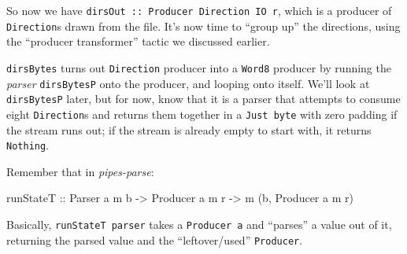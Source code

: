\documentclass[]{article}
\newenvironment{Shaded}{}{}
\newcommand{\KeywordTok}[1]{\textcolor[rgb]{0.00,0.44,0.13}{\textbf{{#1}}}}
\newcommand{\DataTypeTok}[1]{\textcolor[rgb]{0.56,0.13,0.00}{{#1}}}
\newcommand{\CommentTok}[1]{\textcolor[rgb]{0.38,0.63,0.69}{\textit{{#1}}}}
\newcommand{\OtherTok}[1]{\textcolor[rgb]{0.00,0.44,0.13}{{#1}}}
\newcommand{\FunctionTok}[1]{\textcolor[rgb]{0.02,0.16,0.49}{{#1}}}
\newcommand{\NormalTok}[1]{{#1}}
\begin{document}
So now we have \texttt{dirsOut\ ::\ Producer\ Direction\ IO\ r}, which is a
producer of \texttt{Direction}s drawn from the file. It's now time to ``group
up'' the directions, using the ``producer transformer'' tactic we discussed
earlier.

\begin{Shaded}
\end{Shaded}

\texttt{dirsBytes} turns out \texttt{Direction} producer into a \texttt{Word8}
producer by running the \emph{parser} \texttt{dirsBytesP} onto the producer, and
looping onto itself. We'll look at \texttt{dirsBytesP} later, but for now, know
that it is a parser that attempts to consume eight \texttt{Direction}s and
returns them together in a \texttt{Just\ byte} with zero padding if the stream
runs out; if the stream is already empty to start with, it returns
\texttt{Nothing}.

Remember that in \emph{pipes-parse}:

\begin{Shaded}
\begin{Highlighting}[]
\OtherTok{runStateT ::} \DataTypeTok{Parser} \NormalTok{a m b }\OtherTok{->} \DataTypeTok{Producer} \NormalTok{a m r }\OtherTok{->} \NormalTok{m (b, }\DataTypeTok{Producer} \NormalTok{a m r)}
\end{Highlighting}
\end{Shaded}

Basically, \texttt{runStateT\ parser} takes a \texttt{Producer\ a} and
``parses'' a value out of it, returning the parsed value and the
``leftover/used'' \texttt{Producer}.
\end{document}
